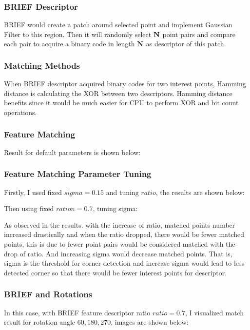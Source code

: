 \documentclass[11pt]{article} \usepackage{fullpage} \usepackage{graphicx} \usepackage{epstopdf} \usepackage{color} \usepackage{psfrag} \usepackage{pdfsync}\usepackage{indentfirst}\usepackage{subfigure}\usepackage{float}\usepackage[section]{placeins}
\begin{document}
\subsubsection{BRIEF Descriptor}

BRIEF would create a patch around selected point and implement Gaussian Filter to this region. Then it will randomly select $\bold{N}$ point pairs and compare each pair to acquire a binary code in length $\bold{N}$ as descriptor of this patch.

\subsubsection{Matching Methods}

When BRIEF descriptor acquired binary codes for two interest points, Hamming distance is calculating the XOR between two descriptors. Hamming distance benefits since it would be much easier for CPU to perform XOR and bit count operations.

\subsubsection{Feature Matching}

Result for default parameters is shown below:



\subsubsection{Feature Matching Parameter Tuning}
Firstly, I used fixed $sigma = 0.15$ and tuning $ratio$, the results are shown below:


Then using fixed $ration = 0.7$, tuning sigma:


As observed in the results. with the increase of ratio, matched points number increased drastically and when the ratio dropped, there would be fewer matched points, this is due to fewer point pairs would be considered matched with the drop of ratio. And increasing sigma would decrease matched points. That is, sigma is the threshold for corner detection and increase sigma would lead to less detected corner so that there would be fewer interest points for descriptor.

\subsubsection{BRIEF and Rotations}

In this case, with BRIEF feature descriptor ratio $ratio = 0.7$, I visualized match result for rotation angle $60, 180, 270$, images are shown below:
\end{document}
